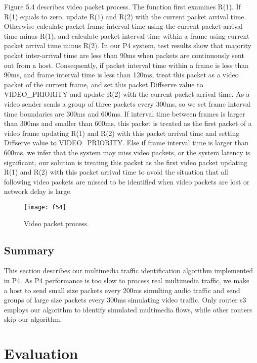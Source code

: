 \documentclass[master]{thesis}
\begin{document}
Figure 5.4 describes video packet process. The function first examines R(1). If R(1) equals to zero, update R(1) and R(2) with the current packet arrival time. Otherwise calculate packet frame interval time using the current packet arrival time minus R(1), and calculate packet interval time within a frame using current packet arrival time minus R(2). In our P4 system, test results show that majority packet inter-arrival time are less than 90ms when packets are continuously sent out from a host. Consequently, if packet interval time within a frame is less than 90ms, and frame interval time is less than 120ms, treat this packet as a video packet of the current frame, and set this packet Diffserve value to VIDEO\_PRIORITY and update R(2) with the current packet arrival time. As a video sender sends a group of three packets every 300ms, so we set frame interval time boundaries are 300ms and 600ms. If interval time between frames is larger than 300ms and smaller than 600ms, this packet is treated as the first packet of a video frame updating R(1) and R(2) with this packet arrival time and setting Diffserve value to VIDEO\_PRIORITY. Else if frame interval time is larger than 600ms, we infer that the system may miss video packets, or the system latency is significant, our solution is treating this packet as the first video packet updating R(1) and R(2) with this packet arrival time to avoid the situation that all following video packets are missed to be identified when video packets are lost or network delay is large. 

\begin{figure}[htp]
    \texttt{[image: f54]}
    \caption[Video packet process.]{Video packet process.}
    \label{fig:f54}
\end{figure}

\section{Summary}

This section describes our multimedia traffic identification algorithm implemented in P4. As P4 performance is too slow to process real multimedia traffic, we make a host to send small size packets every 200ms simulting audio traffic and send groups of large size packets every 300ms simulating video traffic. Only router s3 employs our algorithm to identify simulated multimedia flows, while other routers skip our algorithm.  

\chapter{Evaluation}
\label{chap:evaluation}
\end{document}
